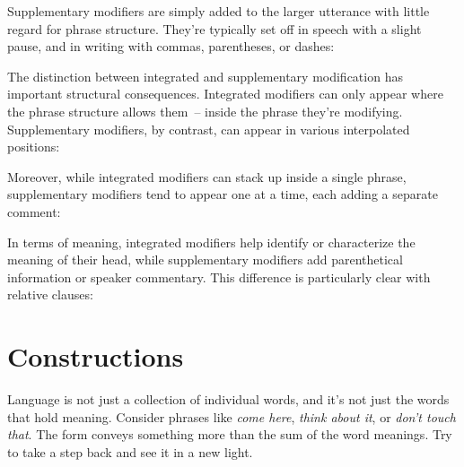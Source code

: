 Supplementary modifiers are simply added to the larger utterance with little regard for phrase structure. They're typically set off in speech with a slight pause, and in writing with commas, parentheses, or dashes:

\ea\label{ex:supplement}
    \z
\z

The distinction between integrated and supplementary modification has important structural consequences. Integrated modifiers can only appear where the phrase structure allows them~-- inside the phrase they're modifying. Supplementary modifiers, by contrast, can appear in various interpolated positions:

\ea\label{ex:supplement-position}
    \z
\z

Moreover, while integrated modifiers can stack up inside a single phrase, supplementary modifiers tend to appear one at a time, each adding a separate comment:

\ea\label{ex:supplement-stack}
    \z
\z

In terms of meaning, integrated modifiers help identify or characterize the meaning of their head, while supplementary modifiers add parenthetical information or speaker commentary. This difference is particularly clear with relative clauses:

\ea\label{ex:relative-contrast}
    \z
\z

\section{Constructions}\label{sec:constructions}
Language is not just a collection of individual words, and it's not just the words that hold meaning. Consider phrases like \textit{come here}, \textit{think about it}, or \textit{don't touch that}. The form conveys something more than the sum of the word meanings. Try to take a step back and see it in a new light.

